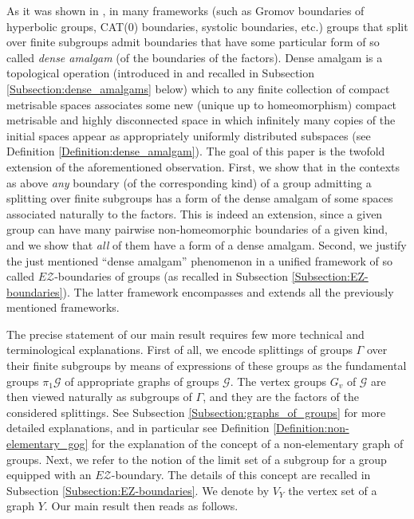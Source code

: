 \documentclass[12pt, a4paper]{article}
\newcommand{\8}{\infty}
\theoremstyle{break}
\theoremstyle{defbreak}
\begin{document}
As it was shown in \cite{dense-amalgam}, in many frameworks
(such as Gromov boundaries of hyperbolic groups, CAT(0) boundaries,
systolic boundaries, etc.) groups that split over finite subgroups admit
boundaries that have some particular form of so called \textit{dense amalgam}
(of the boundaries of the factors).
Dense amalgam is a topological operation (introduced in \cite{dense-amalgam}
and recalled in Subsection \ref{Subsection:dense_amalgams} below) which to any finite collection
of compact metrisable spaces associates some new (unique up to homeomorphism)
compact metrisable and highly disconnected space in which infinitely many copies of the initial spaces
appear as appropriately uniformly distributed subspaces (see Definition \ref{Definition:dense_amalgam}).
The goal of this paper is the twofold extension of the aforementioned observation. First, we show that in the contexts as above 
\textit{any} boundary (of the corresponding kind) of a group admitting
a splitting over finite subgroups has a form of the dense amalgam of some
spaces associated naturally to the factors. This is indeed an extension,
since a given group can have many pairwise non-homeomorphic boundaries
of a given kind, and we show that \textit{all} of them have a form of a 
dense amalgam. Second, we justify the just mentioned ``dense amalgam''
phenomenon in a unified framework of 
so called $E\mathcal{Z}$-boundaries of groups (as recalled in Subsection \ref{Subsection:EZ-boundaries}).
The latter framework encompasses and extends all the previously
mentioned frameworks.

The precise statement of our main result requires few more technical
and terminological explanations. First of all, we encode splittings of groups 
$\Gamma$ over their finite subgroups by means of expressions of
these groups as the fundamental groups $\pi_1\mathcal{G}$ of appropriate
graphs of groups $\mathcal{G}$. The vertex groups $G_v$ of $\mathcal{G}$
are then viewed naturally as subgroups of $\Gamma$, and they are the factors
of the considered splittings. See Subsection \ref{Subsection:graphs_of_groups} for more detailed explanations, and in particular see Definition \ref{Definition:non-elementary_gog} for the explanation of the concept
of a non-elementary graph of groups.
Next, we refer to the notion of the limit set of a subgroup for a group
equipped with an $E\mathcal{Z}$-boundary. The details of this concept
are recalled in Subsection \ref{Subsection:EZ-boundaries}. 
We denote by $V_Y$ the vertex set of a graph $Y$.
Our main result then reads as follows.
\end{document}
